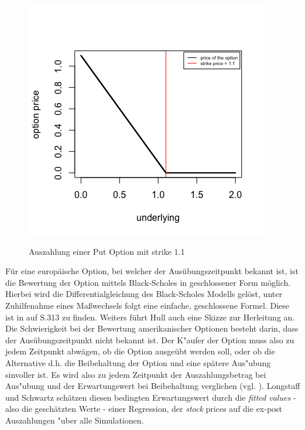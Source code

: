 \documentclass[10pt,a4paper]{report}\usepackage[]{graphicx}\usepackage[]{color}
\begin{document}
\begin{figure}[H]
  \centering
  \includegraphics[scale=0.7]{PlotOption.png}
  \label{fig:PlotOption}
  \caption{Auszahlung einer Put Option mit strike 1.1}
\end{figure}

Für eine europäische Option, bei welcher der Ausübungszeitpunkt bekannt ist, ist die Bewertung der Option mittels Black-Scholes in geschlossener Form möglich. Hierbei wird die Differentialgleichung des Black-Scholes Modells gelöst, unter Zuhilfenahme eines Maßwechsels folgt eine einfache, geschlossene Formel. Diese ist in \cite{Hull} auf S.313 zu finden. Weiters führt Hull auch eine Skizze zur Herleitung an.\\
Die Schwierigkeit bei der Bewertung amerikanischer Optionen besteht darin, dass der Ausübungszeitpunkt nicht bekannt ist. Der K"aufer der Option muss also zu jedem Zeitpunkt abwägen, ob die Option ausgeübt werden soll, oder ob die Alternative d.h. die Beibehaltung der Option und eine spätere Aus"ubung sinvoller ist. Es wird also zu jedem Zeitpunkt der Auszahlungsbetrag bei Aus"ubung und der Erwartungswert bei Beibehaltung verglichen (vgl.  \cite[S.114]{schwartz2001}). Longstaff und Schwartz schätzen diesen bedingten Erwartungswert durch die \textit{fitted values} - also die geschätzten Werte - einer Regression, der \textit{stock} prices auf die ex-post Auszahlungen "uber alle Simulationen.
\end{document}
